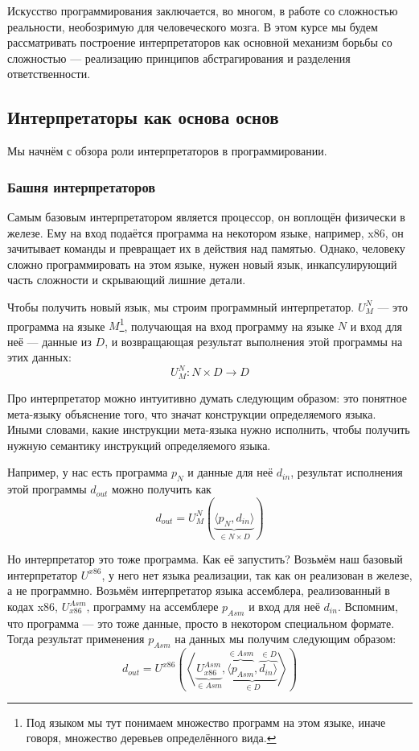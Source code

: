 Искусство программирования заключается, во многом, в работе со сложностью реальности, необозримую для человеческого мозга.
В этом курсе мы будем рассматривать построение интерпретаторов как основной механизм борьбы со сложностью --- реализацию принципов абстрагирования и разделения ответственности.

\subsection{Интерпретаторы как основа основ}

Мы начнём с обзора роли интерпретаторов в программировании.

\subsubsection{Башня интерпретаторов} \label{subsec:interpreters-tower}

Самым базовым интерпретатором является процессор, он воплощён физически в железе.
Ему на вход подаётся программа на некотором языке, например, x86, он зачитывает команды и превращает их в действия над памятью.
Однако, человеку сложно программировать на этом языке, нужен новый язык, инкапсулирующий часть сложности и скрывающий лишние детали.

Чтобы получить новый язык, мы строим программный интерпретатор.
 $U_M^N$ --- это программа на языке $M$\footnote{Под языком мы тут понимаем множество программ на этом языке, иначе говоря, множество деревьев определённого вида.}, получающая на вход программу на языке $N$ и вход для неё --- данные из $D$, и возвращающая результат выполнения этой программы на этих данных: \[U_M^N : N\times D\to D\]

Про интерпретатор можно интуитивно думать следующим образом: это понятное мета-языку объяснение того, что значат конструкции определяемого языка.
Иными словами, какие инструкции мета-языка нужно исполнить, чтобы получить нужную семантику инструкций определяемого языка.

Например, у нас есть программа $p_N$ и данные для неё $d_{in}$, результат исполнения этой программы $d_{out}$ можно получить как \[d_{out} = U_M^N\left( \underbrace{\langle p_N, d_{in} \rangle}_{\in N\times D} \right)\]

Но интерпретатор это тоже программа.
Как её запустить?
Возьмём наш базовый интерпретатор $U^{x86}$, у него нет языка реализации, так как он реализован в железе, а не программно.
Возьмём интерпретатор языка ассемблера, реализованный в кодах x86, $U_{x86}^{Asm}$, программу на ассемблере $p_{Asm}$ и вход для неё $d_{in}$.
Вспомним, что программа --- это тоже данные, просто в некотором специальном формате.
Тогда результат применения $p_{Asm}$ на данных мы получим следующим образом:
\[
    d_{out} = U^{x86}\left(\left<\underbrace{U_{x86}^{Asm}}_{\in Asm}, \underbrace{\overbrace{\langle p_{Asm}}^{\in Asm}, \overbrace{d_{in} \rangle}^{\in D}}_{\in D} \right>\right)
\]

